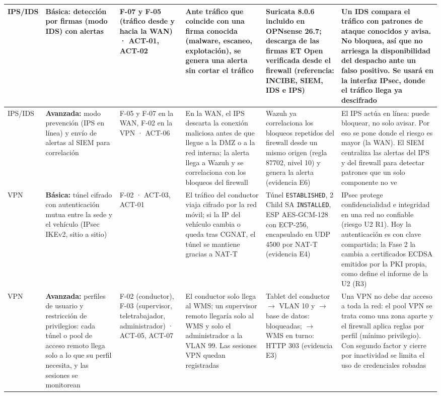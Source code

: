 \documentclass[11pt,a4paper]{article}
\newcommand{\ra}{\ensuremath{\rightarrow}}
\newcommand{\cd}[1]{\texttt{#1}}
\begin{document}
\begin{landscape}
{\begin{longtable}{@{}P{2.0cm}P{3.4cm}P{2.7cm}P{4.3cm}P{4.3cm}P{5.7cm}@{}}
IPS/IDS & \textbf{Básica:} detección por firmas (modo IDS) con alertas & F-07 y F-05 (tráfico desde y hacia la WAN) · ACT-01, ACT-02 & Ante tráfico que coincide con una firma conocida (malware, escaneo, explotación), se genera una alerta sin cortar el tráfico & Suricata 8.0.6 incluido en OPNsense 26.7; descarga de las firmas ET Open verificada desde el firewall (referencia: INCIBE, SIEM, IDS e IPS) & Un IDS compara el tráfico con patrones de ataque conocidos y avisa. No bloquea, así que no arriesga la disponibilidad del despacho ante un falso positivo. Se usará en la interfaz IPsec, donde el tráfico llega ya descifrado \\ \midrule
IPS/IDS & \textbf{Avanzada:} modo prevención (IPS en línea) y envío de alertas al SIEM para correlación & F-05 y F-07 en la WAN, F-02 en la VPN · ACT-06 & En la WAN, el IPS descarta la conexión maliciosa antes de que llegue a la DMZ o a la red interna; la alerta llega a Wazuh y se correlaciona con los bloqueos del firewall & Wazuh ya correlaciona los bloqueos repetidos del firewall desde un mismo origen (regla 87702, nivel 10) y genera la alerta (evidencia E6) & El IPS actúa en línea: puede bloquear, no solo avisar. Por eso se pone donde el riesgo es mayor (la WAN). El SIEM centraliza las alertas del IPS y del firewall para detectar patrones que un solo componente no ve \\ \midrule
VPN & \textbf{Básica:} túnel cifrado con autenticación mutua entre la sede y el vehículo (IPsec IKEv2, sitio a sitio) & F-02 · ACT-03, ACT-01 & El tráfico del conductor viaja cifrado por la red móvil; si la IP del vehículo cambia o queda tras CGNAT, el túnel se mantiene gracias a NAT-T & Túnel \cd{ESTABLISHED}, 2 Child SA \cd{INSTALLED}, ESP AES-GCM-128 con ECP-256, encapsulado en UDP 4500 por NAT-T (evidencia E4) & IPsec protege confidencialidad e integridad en una red no confiable (riesgo U2 R1). Hoy la autenticación es con clave compartida; la Fase 2 la cambia a certificados ECDSA emitidos por la PKI propia, como define el informe de la U2 (R3) \\ \midrule
VPN & \textbf{Avanzada:} perfiles de usuario y restricción de privilegios: cada túnel o pool de acceso remoto llega solo a lo que su perfil necesita, y las sesiones se monitorean & F-02 (conductor), F-03 (supervisor, teletrabajador, administrador) · ACT-05, ACT-07 & El conductor solo llega al WMS; un supervisor remoto llegaría solo al WMS y solo el administrador a la VLAN 99. Las sesiones VPN quedan registradas & Tablet del conductor \ra{} VLAN 10 y \ra{} base de datos: bloqueadas; \ra{} WMS en turno: HTTP 303 (evidencia E3) & Una VPN no debe dar acceso a toda la red: el pool VPN se trata como una zona aparte y el firewall aplica reglas por perfil (mínimo privilegio). Con segundo factor y cierre por inactividad se limita el uso de credenciales robadas \\ \bottomrule
\end{longtable}
}
\end{landscape}
\end{document}
